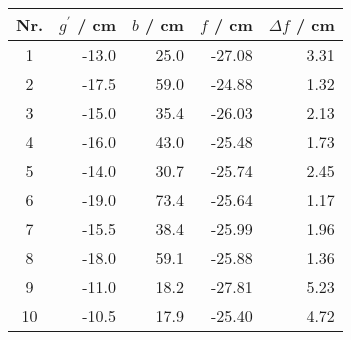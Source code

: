 \begin{tabular}{c|rrrr}
Nr. & $g^\prime$ / cm & $b$ / cm & $f$ / cm & $\Delta f$ / cm \\
\hline
1 & -13.0 & 25.0 & -27.08 & 3.31\\
2 & -17.5 & 59.0 & -24.88 & 1.32\\
3 & -15.0 & 35.4 & -26.03 & 2.13\\
4 & -16.0 & 43.0 & -25.48 & 1.73\\
5 & -14.0 & 30.7 & -25.74 & 2.45\\
6 & -19.0 & 73.4 & -25.64 & 1.17\\
7 & -15.5 & 38.4 & -25.99 & 1.96\\
8 & -18.0 & 59.1 & -25.88 & 1.36\\
9 & -11.0 & 18.2 & -27.81 & 5.23\\
10 & -10.5 & 17.9 & -25.40 & 4.72
\end{tabular}
